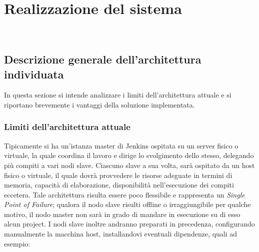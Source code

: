 
\pagestyle{IHA-fancy-style}
\chapter{Realizzazione del sistema}
\label{cap:realizzazione-del-sistema}

\\

\section{Descrizione generale dell'architettura individuata}

In questa sezione si intende analizzare i limiti dell'architettura attuale e si riportano brevemente i vantaggi della soluzione implementata.

\subsection{Limiti dell'architettura attuale}
\label{subsec:limiti}

Tipicamente si ha un'istanza \gls{master} di Jenkins ospitata su un server fisico o virtuale, la quale coordina il lavoro e dirige lo svolgimento dello stesso, delegando più compiti a vari nodi \gls{slave}. Ciascuno slave a sua volta, sarà ospitato da un \gls{host} fisico o virtuale, il quale dovrà provvedere le risorse adeguate in termini di memoria, capacità di elaborazione, disponibilità nell'esecuzione dei compiti eccetera. Tale architettura risulta essere poco flessibile e rappresenta un \textit{Single Point of Failure}; qualora il nodo \gls{slave} risulti offline o irraggiungibile per qualche motivo, il nodo \gls{master} non sarà in grado di mandare in esecuzione su di esso alcun \gls{project}. I nodi \gls{slave} inoltre andranno preparati in precedenza, configurando manualmente la macchina \gls{host}, installandovi eventuali dipendenze, quali ad esempio: 


